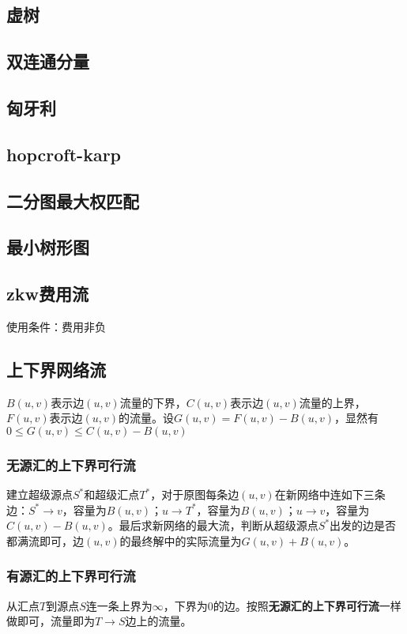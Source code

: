 \documentclass[landscape,a4paper]{article}
\begin{document}
\begin{spacing}{0.3}
\begin{multicols}{3}
	\subsection{虚树}
	
	\subsection{双连通分量}
	
	\subsection{匈牙利}
	
	\subsection{hopcroft-karp}
	
	\subsection{二分图最大权匹配}
	
	\subsection{最小树形图}
	
	\subsection{zkw费用流}
	使用条件：费用非负
	
	\subsection{上下界网络流}
$B(u,v)$表示边$(u,v)$流量的下界，$C(u,v)$表示边$(u,v)$流量的上界，$F(u,v)$表示边$(u,v)$的流量。设$G(u,v) = F(u,v) - B(u,v)$，显然有$0 \leq G(u,v) \leq C(u,v)-B(u,v)$
\subsubsection{无源汇的上下界可行流}
建立超级源点$S^*$和超级汇点$T^*$，对于原图每条边$(u,v)$在新网络中连如下三条边：$S^* \rightarrow v$，容量为$B(u,v)$；$u \rightarrow T^*$，容量为$B(u,v)$；$u \rightarrow v$，容量为$C(u,v) - B(u,v)$。最后求新网络的最大流，判断从超级源点$S^*$出发的边是否都满流即可，边$(u,v)$的最终解中的实际流量为$G(u,v)+B(u,v)$。
\subsubsection{有源汇的上下界可行流}
从汇点$T$到源点$S$连一条上界为$\infty$，下界为$0$的边。按照\textbf{无源汇的上下界可行流}一样做即可，流量即为$T \rightarrow S$边上的流量。

\end{multicols}
\end{spacing}
\end{document}

